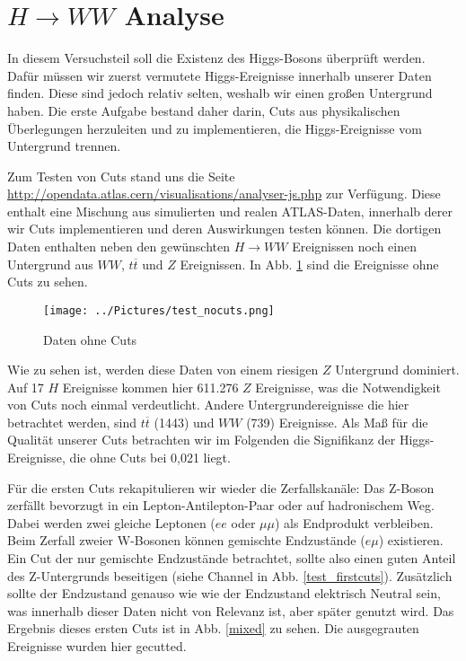 \section{$H \rightarrow WW$ Analyse}

In diesem Versuchsteil soll die Existenz des Higgs-Bosons überprüft werden.
Dafür müssen wir zuerst vermutete Higgs-Ereignisse innerhalb unserer Daten finden.
Diese sind jedoch relativ selten, weshalb wir einen großen Untergrund haben.
Die erste Aufgabe bestand daher darin, Cuts aus physikalischen Überlegungen herzuleiten und zu implementieren, die Higgs-Ereignisse vom Untergrund trennen.

Zum Testen von Cuts stand uns die Seite \url{http://opendata.atlas.cern/visualisations/analyser-js.php} zur Verfügung.
Diese enthalt eine Mischung aus simulierten und realen ATLAS-Daten, innerhalb derer wir Cuts implementieren und deren Auswirkungen testen können.
Die dortigen Daten enthalten neben den gewünschten $H \rightarrow WW$ Ereignissen noch einen Untergrund aus $WW$, $t\overline{t}$ und $Z$ Ereignissen.
In Abb. \ref{test_nocuts} sind die Ereignisse ohne Cuts zu sehen.


\begin{figure}[h]
\texttt{[image: ../Pictures/test\_nocuts.png]}
\caption{Daten ohne Cuts \cite{opendata}}
\label{test_nocuts}
\end{figure}

\clearpage

Wie zu sehen ist, werden diese Daten von einem riesigen $Z$ Untergrund dominiert.
Auf 17 $H$ Ereignisse kommen hier 611.276 $Z$ Ereignisse, was die Notwendigkeit von Cuts noch einmal verdeutlicht.
Andere Untergrundereignisse die hier betrachtet werden, sind $t\overline{t}$ (1443) und $WW$ (739) Ereignisse.
Als Maß für die Qualität unserer Cuts betrachten wir im Folgenden die Signifikanz der Higgs-Ereignisse, die ohne Cuts bei 0,021 liegt.

Für die ersten Cuts rekapitulieren wir wieder die Zerfallskanäle:
Das Z-Boson zerfällt bevorzugt in ein Lepton-Antilepton-Paar oder auf hadronischem Weg.
Dabei werden zwei gleiche Leptonen ($ee$ oder $\mu \mu$) als Endprodukt verbleiben.
Beim Zerfall zweier W-Bosonen können gemischte Endzustände ($e \mu$) existieren.
Ein Cut der nur gemischte Endzustände betrachtet, sollte also einen guten Anteil des Z-Untergrunds beseitigen (siehe Channel in Abb. \ref{test_firstcuts}).
Zusätzlich sollte der Endzustand genauso wie wie der Endzustand elektrisch Neutral sein, was innerhalb dieser Daten nicht von Relevanz ist, aber später genutzt wird.
Das Ergebnis dieses ersten Cuts ist in Abb. \ref{mixed} zu sehen.
Die ausgegrauten Ereignisse wurden hier gecutted.

